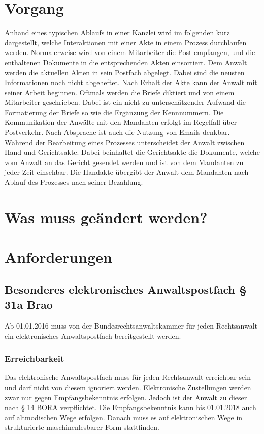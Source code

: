 
\section{Vorgang}
Anhand eines typischen Ablaufs in einer Kanzlei wird im folgenden kurz dargestellt, welche Interaktionen mit einer Akte in einem Prozess durchlaufen werden.
Normalerweise wird von einem Mitarbeiter die Post empfangen, und die enthaltenen Dokumente in die entsprechenden Akten einsortiert. Dem Anwalt werden die aktuellen Akten in sein Postfach abgelegt. Dabei sind die neusten Informationen noch nicht abgeheftet. Nach Erhalt der Akte kann der Anwalt mit seiner Arbeit beginnen. Oftmals werden die Briefe diktiert und von einem Mitarbeiter geschrieben. Dabei ist ein nicht zu unterschätzender Aufwand die Formatierung der Briefe so wie die Ergänzung der Kennnummern.
Die Kommunikation der Anwälte mit den Mandanten erfolgt im Regelfall über Postverkehr. Nach Absprache ist auch die Nutzung von Emails denkbar.
Während der Bearbeitung eines Prozesses unterscheidet der Anwalt zwischen Hand und Gerichtsakte. Dabei beinhaltet die Gerichtsakte die Dokumente, welche vom Anwalt an das Gericht gesendet werden und ist von dem Mandanten zu jeder Zeit einsehbar. Die Handakte übergibt der Anwalt dem Mandanten nach Ablauf des Prozesses nach seiner Bezahlung.
	  
\section{Was muss geändert werden?}

\section{Anforderungen}

\subsection{Besonderes elektronisches Anwaltspostfach § 31a Brao}
Ab 01.01.2016 muss von der Bundesrechtsanwaltskammer für jeden Rechtsanwalt ein elektronisches Anwaltspostfach bereitgestellt werden.
\subsubsection*{Erreichbarkeit}
Das elektronische Anwaltspostfach muss für jeden Rechtsanwalt erreichbar sein und darf nicht von diesem ignoriert werden. Elektronische Zustellungen werden zwar nur gegen Empfangsbekenntnis erfolgen. Jedoch ist der Anwalt zu dieser nach § 14 BORA verpflichtet. Die Empfangsbekenntnis kann bis 01.01.2018 auch auf altmodischen Wege erfolgen. Danach muss es auf elektronischen Wege in strukturierte maschinenlesbarer Form stattfinden.
